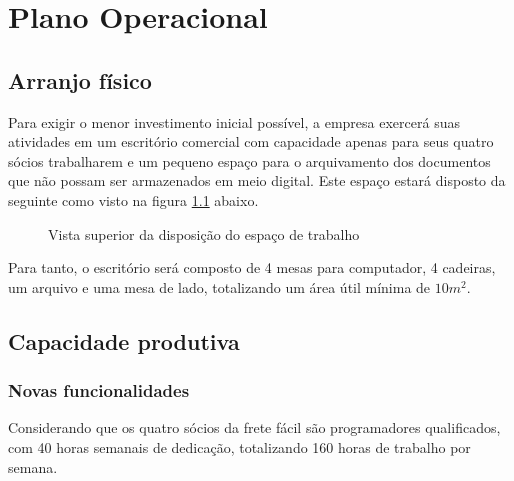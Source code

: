 \chapter{Plano Operacional}

\section{Arranjo físico}
Para exigir o menor investimento inicial possível, a empresa exercerá suas atividades em um escritório comercial com capacidade apenas para seus quatro sócios trabalharem e um pequeno espaço para o arquivamento dos documentos que não possam ser armazenados em meio digital. Este espaço estará disposto da seguinte como visto na figura \ref{fig:escritorio} abaixo.

\begin{figure}[!h]
  \begin{center}
    \caption{Vista superior da disposição do espaço de trabalho}
    \label{fig:escritorio}
  \end{center}
\end{figure}

Para tanto, o escritório será composto de 4 mesas para computador, 4 cadeiras, um arquivo e uma mesa de lado, totalizando um área útil mínima de $10m^{2}$.

\section{Capacidade produtiva}
  \subsection{Novas funcionalidades}
  Considerando que os quatro sócios da frete fácil são programadores qualificados, com 40 horas semanais de dedicação, totalizando 160 horas de trabalho por semana.
  
